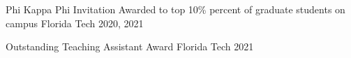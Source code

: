 \begin{cvhonors}
	\cvhonor
	{Phi Kappa Phi Invitation}
	{Awarded to top 10\% percent of graduate students on campus}
	{Florida Tech}
	{2020, 2021}

	\cvhonor
	{Outstanding Teaching Assistant Award}
	{}
	{Florida Tech}
	{2021}

\end{cvhonors}
